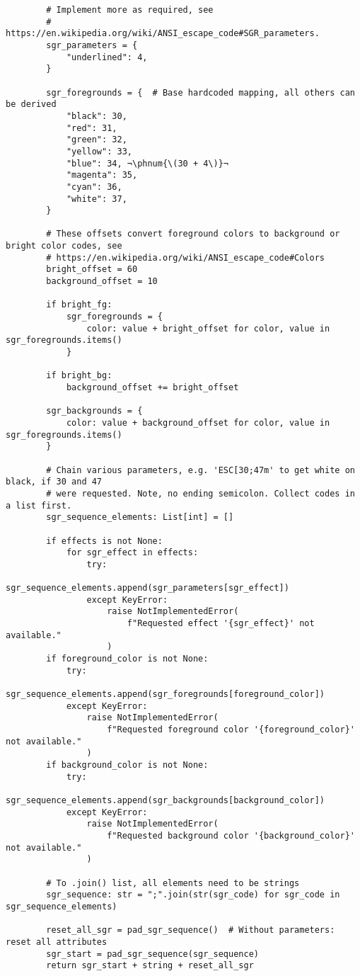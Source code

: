 \begin{lstlisting}
        # Implement more as required, see
        # https://en.wikipedia.org/wiki/ANSI_escape_code#SGR_parameters.
        sgr_parameters = {
            "underlined": 4,
        }
    
        sgr_foregrounds = {  # Base hardcoded mapping, all others can be derived
            "black": 30,
            "red": 31,
            "green": 32,
            "yellow": 33,
            "blue": 34, ¬\phnum{\(30 + 4\)}¬
            "magenta": 35,
            "cyan": 36,
            "white": 37,
        }
    
        # These offsets convert foreground colors to background or bright color codes, see
        # https://en.wikipedia.org/wiki/ANSI_escape_code#Colors
        bright_offset = 60
        background_offset = 10
    
        if bright_fg:
            sgr_foregrounds = {
                color: value + bright_offset for color, value in sgr_foregrounds.items()
            }
    
        if bright_bg:
            background_offset += bright_offset
    
        sgr_backgrounds = {
            color: value + background_offset for color, value in sgr_foregrounds.items()
        }
    
        # Chain various parameters, e.g. 'ESC[30;47m' to get white on black, if 30 and 47
        # were requested. Note, no ending semicolon. Collect codes in a list first.
        sgr_sequence_elements: List[int] = []
    
        if effects is not None:
            for sgr_effect in effects:
                try:
                    sgr_sequence_elements.append(sgr_parameters[sgr_effect])
                except KeyError:
                    raise NotImplementedError(
                        f"Requested effect '{sgr_effect}' not available."
                    )
        if foreground_color is not None:
            try:
                sgr_sequence_elements.append(sgr_foregrounds[foreground_color])
            except KeyError:
                raise NotImplementedError(
                    f"Requested foreground color '{foreground_color}' not available."
                )
        if background_color is not None:
            try:
                sgr_sequence_elements.append(sgr_backgrounds[background_color])
            except KeyError:
                raise NotImplementedError(
                    f"Requested background color '{background_color}' not available."
                )
    
        # To .join() list, all elements need to be strings
        sgr_sequence: str = ";".join(str(sgr_code) for sgr_code in sgr_sequence_elements)
    
        reset_all_sgr = pad_sgr_sequence()  # Without parameters: reset all attributes
        sgr_start = pad_sgr_sequence(sgr_sequence)
        return sgr_start + string + reset_all_sgr
\end{lstlisting}


